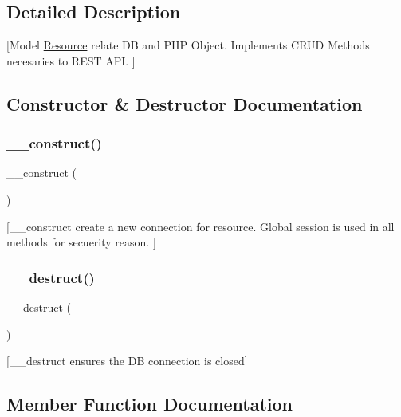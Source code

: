 \subsection{Detailed Description}
\mbox{[}Model \mbox{\hyperlink{class_resource}{Resource}} relate DB and P\+HP Object. Implements C\+R\+UD Methods necesaries to R\+E\+ST A\+PI. \mbox{]} 

\subsection{Constructor \& Destructor Documentation}
\mbox{\label{class_resource_a095c5d389db211932136b53f25f39685}} 
\subsubsection{\texorpdfstring{\+\_\+\+\_\+construct()}{\_\_construct()}}
{\footnotesize\ttfamily \+\_\+\+\_\+construct (\begin{DoxyParamCaption}{ }\end{DoxyParamCaption})}

\mbox{[}\+\_\+\+\_\+construct create a new connection for resource. Global session is used in all methods for secuerity reason. \mbox{]} \mbox{\label{class_resource_a421831a265621325e1fdd19aace0c758}} 
\subsubsection{\texorpdfstring{\+\_\+\+\_\+destruct()}{\_\_destruct()}}
{\footnotesize\ttfamily \+\_\+\+\_\+destruct (\begin{DoxyParamCaption}{ }\end{DoxyParamCaption})}

\mbox{[}\+\_\+\+\_\+destruct ensures the DB connection is closed\mbox{]} 

\subsection{Member Function Documentation}
\mbox{\label{class_resource_ab31369bc9c8f31518ed38c1949beb791}} 
